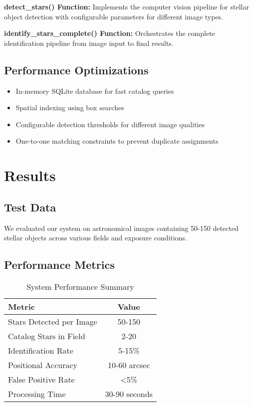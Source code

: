\documentclass[11pt,a4paper]{article}
\begin{document}
\textbf{detect\_stars() Function:}
Implements the computer vision pipeline for stellar object detection with configurable parameters for different image types.

\textbf{identify\_stars\_complete() Function:}
Orchestrates the complete identification pipeline from image input to final results.

\subsection{Performance Optimizations}

\begin{itemize}
    \item In-memory SQLite database for fast catalog queries
    \item Spatial indexing using box searches
    \item Configurable detection thresholds for different image qualities
    \item One-to-one matching constraints to prevent duplicate assignments
\end{itemize}

\section{Results}

\subsection{Test Data}

We evaluated our system on astronomical images containing 50-150 detected stellar objects across various fields and exposure conditions.

\subsection{Performance Metrics}

\begin{table}[H]
\centering
\begin{tabular}{@{}lc@{}}
\toprule
Metric & Value \\
\midrule
Stars Detected per Image & 50-150 \\
Catalog Stars in Field & 2-20 \\
Identification Rate & 5-15\% \\
Positional Accuracy & 10-60 arcsec \\
False Positive Rate & <5\% \\
Processing Time & 30-90 seconds \\
\bottomrule
\end{tabular}
\caption{System Performance Summary}
\label{tab:performance}
\end{table}
\end{document}

